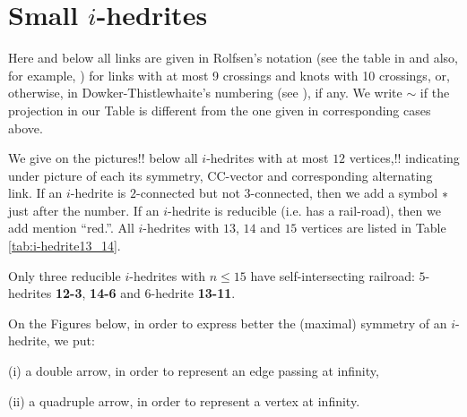 \documentclass[12pt]{article}
\begin{document}





\section{Small $i$-hedrites}

Here and below all links are given 
in Rolfsen's notation (see the table in \cite{Rolf} and also,  
for example, \cite{Kaw}) for links with at most 9 
crossings and knots with 10 crossings, or, otherwise, in
Dowker-Thistlewhaite's numbering (see \cite{T}), if any.
We write $\sim$ if the projection in our Table is different 
from the one given in corresponding cases above.

We give on the pictures!! below all $i$-hedrites with at most $12$ vertices,!! 
indicating under 
picture of each its symmetry, CC-vector and corresponding alternating link.
If an $i$-hedrite is $2$-connected but not $3$-connected, then we add
a symbol ${\bf *}$ just after the number. If an $i$-hedrite is reducible
(i.e. has a rail-road), then we add mention ``red.''. All $i$-hedrites
with $13$, $14$ and $15$ vertices are listed in Table
\ref{tab:i-hedrite13_14}.

Only three reducible $i$-hedrites with $n \leq 15$ have self-intersecting
railroad: $5$-hedrites {\bf 12-3}, {\bf 14-6} and $6$-hedrite {\bf 13-11}.


On the Figures below, in order to express better the (maximal)
symmetry of an $i$-hedrite, we put:

(i) a double arrow, in order to represent an edge passing at infinity,

(ii) a quadruple arrow, in order to represent a vertex at infinity.
\end{document}
